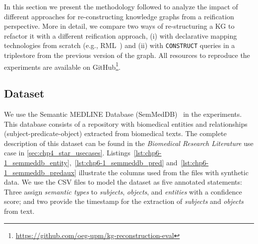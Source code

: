 In this section we present the methodology followed to analyze the impact of different approaches for re-constructing knowledge graphs from a reification perspective. More in detail, we compare two ways of re-structuring a KG to refactor it with a different reification approach, (i) with declarative mapping technologies from scratch (e.g., RML~\parencite{Dimou2014rml,iglesias2023rml}) and (ii) with \texttt{CONSTRUCT} queries in a triplestore from the previous version of the graph. 
All resources to reproduce the experiments are available on GitHub\footnote{\url{https://github.com/oeg-upm/kg-reconstruction-eval}}.



\subsection{Dataset}
\label{sec:chp6-1_dataset}


We use the Semantic MEDLINE Database (SemMedDB)~\parencite{SemMedDB} in the experiments. This database consists of a repository with biomedical entities and relationships (subject-predicate-object) extracted from biomedical texts. The complete description of this dataset can be found in the \textit{Biomedical Research Literature} use case in \cref{sec:chp4_star_usecases}. Listings~\ref{lst:chp6-1_semmeddb_entity},~\ref{lst:chp6-1_semmeddb_pred} and~\ref{lst:chp6-1_semmeddb_predaux} illustrate the columns used from the files with synthetic data.
We use the CSV files to model the dataset as five annotated statements: 
Three assign \textit{semantic types} to \textit{subjects}, \textit{objects}, and \textit{entities} with a confidence score; and two provide the timestamp for the extraction of \textit{subjects} and \textit{objects} from text. 



